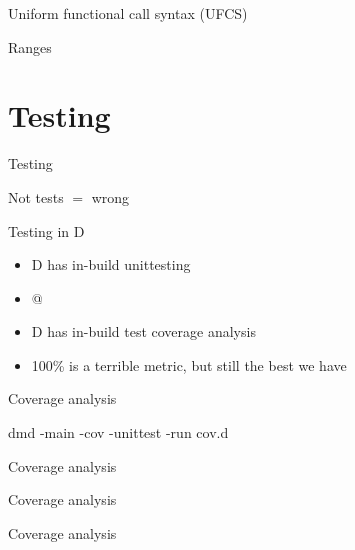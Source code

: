 \documentclass[aspectratio=169,notes]{beamer}
\begin{document}
	\begin{frame}[fragile]{Uniform functional call syntax (UFCS)}
		
	\end{frame}

	\begin{frame}[fragile]{Ranges}
		
	\end{frame}

	\section{Testing}
	\begin{frame}[fragile]{Testing}
		\begin{center}
		\Large Not tests $=$ wrong
		\end{center}
	\end{frame}

	\begin{frame}[fragile]{Testing in D}
		\begin{itemize}
			\item D has in-build unittesting
			\item \lstinline@unittest { }@
			\item D has in-build test coverage analysis
			\item 100\% is a terrible metric, but still the best we have
		\end{itemize}
	\end{frame}

	\begin{frame}[fragile]{Coverage analysis}
		
		dmd -main -cov -unittest -run cov.d
	\end{frame}

	\begin{frame}[fragile]{Coverage analysis}
		
	\end{frame}

	\begin{frame}[fragile]{Coverage analysis}
		
	\end{frame}

	\begin{frame}[fragile]{Coverage analysis}
		
	\end{frame}
\end{document}

